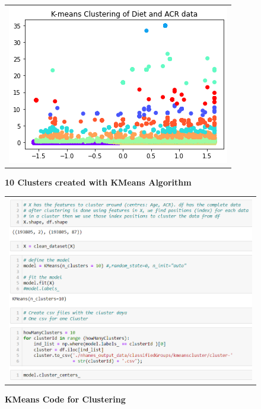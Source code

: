 \begin{figure}
\begin{tabular}{c}
\includegraphics[scale=0.6]{images/kmeans/cluster-plot.png} \\
\end{tabular}
\caption{\textbf{10 Clusters created with KMeans Algorithm}}
\label{cluster-plot}
\vspace{0.25cm}
\end{figure}

\begin{figure}
\begin{tabular}{c}
\includegraphics[scale=0.6]{images/kmeans/kmeans-clustering-implementations.png} \\
\end{tabular}
\caption{\textbf{KMeans Code for Clustering }}
\label{kmeans-python}
\vspace{0.25cm}
\end{figure}